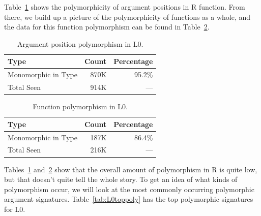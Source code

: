 \documentclass[acmsmall,10pt,review,anonymous]{acmart}\settopmatter{printfolios=true,printccs=false,printacmref=false}
\begin{document}
Table~\ref{tab:L0argcounts} shows the polymorphicity of argument positions
 in R function.  From there, we build up a picture of the polymorphicity of
 functions as a whole, and the data for this function polymorphism can be
 found in Table~\ref{tab:L0funcounts}.

\begin{table}[ht]\label{tab:L0argcounts}\centering\begin{tabular}{lrr}  \hline
Type                   & Count & Percentage \\  \hline
  Monomorphic in Type & 870K & 95.2\% \\ 
  Total Seen & 914K & --- \\ 
   \hline
\end{tabular}
\caption{Argument position polymorphism in L0.}
\end{table}

\begin{table}[ht]
\label{tab:L0funcounts}
\centering
\begin{tabular}{lrr}
  \hline
Type & Count & Percentage \\
  \hline
  Monomorphic in Type & 187K & 86.4\% \\ 
  Total Seen & 216K & --- \\
   \hline
\end{tabular}
\caption{Function polymorphism in L0.}
\end{table}

Tables~\ref{tab:L0argcounts} and~\ref{tab:L0funcounts} show that the overall amount of polymorphism in R is quite low, but that doesn't quite tell the whole story.
To get an idea of what kinds of polymorphism occur, we will look at the most commonly occurring polymorphic argument signatures.  
Table~\ref{tab:L0toppoly} has the top polymorphic signatures for L0.
\end{document}
